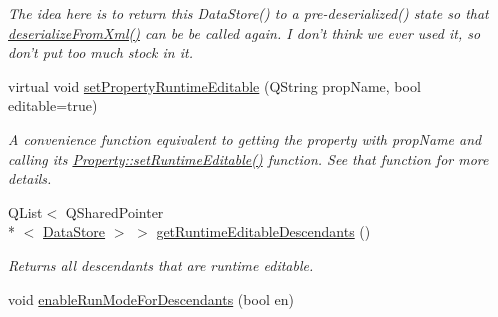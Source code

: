 \begin{DoxyCompactItemize}
\begin{DoxyCompactList}\small\item\em The idea here is to return this Data\-Store() to a pre-\/deserialized() state so that \hyperlink{class_picto_1_1_data_store_a37bb8f90b4d8c2e12970a276e6a6ec91}{deserialize\-From\-Xml()} can be be called again. I don't think we ever used it, so don't put too much stock in it. \end{DoxyCompactList}\item 
\hypertarget{class_picto_1_1_data_store_a8aa2e93b4249fc189ae7e0b9317efd1c}{virtual void \hyperlink{class_picto_1_1_data_store_a8aa2e93b4249fc189ae7e0b9317efd1c}{set\-Property\-Runtime\-Editable} (Q\-String prop\-Name, bool editable=true)}\label{class_picto_1_1_data_store_a8aa2e93b4249fc189ae7e0b9317efd1c}

\begin{DoxyCompactList}\small\item\em A convenience function equivalent to getting the property with prop\-Name and calling its \hyperlink{class_picto_1_1_property_add3e9d7a904e0b13242a23a78f698e9f}{Property\-::set\-Runtime\-Editable()} function. See that function for more details. \end{DoxyCompactList}\item 
Q\-List$<$ Q\-Shared\-Pointer\\*
$<$ \hyperlink{class_picto_1_1_data_store}{Data\-Store} $>$ $>$ \hyperlink{class_picto_1_1_data_store_a5c95e9717d341aeed7167f851b8dbb7d}{get\-Runtime\-Editable\-Descendants} ()
\begin{DoxyCompactList}\small\item\em Returns all descendants that are runtime editable. \end{DoxyCompactList}\item 
\hypertarget{class_picto_1_1_data_store_ac3234f93edec17a3f0bffa4684f5c045}{void \hyperlink{class_picto_1_1_data_store_ac3234f93edec17a3f0bffa4684f5c045}{enable\-Run\-Mode\-For\-Descendants} (bool en)}\label{class_picto_1_1_data_store_ac3234f93edec17a3f0bffa4684f5c045}


\end{DoxyCompactItemize}
